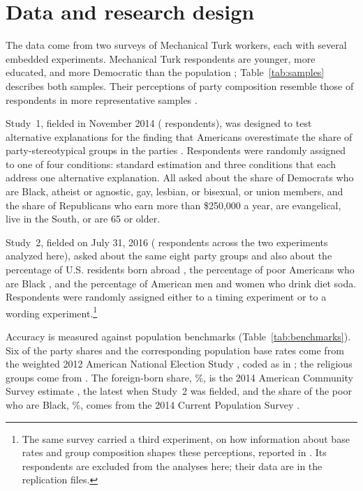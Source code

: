 \documentclass[11pt]{article}
\begin{document}
\section{Data and research design}

The data come from two surveys of Mechanical Turk workers, each with several embedded experiments. Mechanical Turk respondents are younger, more educated, and more Democratic than the population \citep{berinsky2012}; Table~\ref{tab:samples} describes both samples. Their perceptions of party composition resemble those of respondents in more representative samples \citep{ahler2018}.

Study~1, fielded in November 2014 (\nStudyOne{} respondents), was designed to test alternative explanations for the finding that Americans overestimate the share of party-stereotypical groups in the parties \citep{ahler2018}. Respondents were randomly assigned to one of four conditions: standard estimation and three conditions that each address one alternative explanation. All asked about the share of Democrats who are Black, atheist or agnostic, gay, lesbian, or bisexual, or union members, and the share of Republicans who earn more than \$250,000 a year, are evangelical, live in the South, or are 65 or older.

Study~2, fielded on July 31, 2016 (\nStudyTwo{} respondents across the two experiments analyzed here), asked about the same eight party groups and also about the percentage of U.S. residents born abroad \citep{alba2005}, the percentage of poor Americans who are Black \citep{gilens1996}, and the percentage of American men and women who drink diet soda. Respondents were randomly assigned either to a timing experiment or to a wording experiment.\footnote{The same survey carried a third experiment, on how information about base rates and group composition shapes these perceptions, reported in \citet{ahler2022typecast}. Its respondents are excluded from the analyses here; their data are in the replication files.}

Accuracy is measured against population benchmarks (Table~\ref{tab:benchmarks}). Six of the party shares and the corresponding population base rates come from the weighted 2012 American National Election Study \citep{anes2012}, coded as in \citet{ahler2018}; the religious groups come from \citet{pew2012nones}. The foreign-born share, \immTruth\%, is the 2014 American Community Survey estimate \citep{pew2016immigrants}, the latest when Study~2 was fielded, and the share of the poor who are Black, \poorTruth\%, comes from the 2014 Current Population Survey \citep{census2015}.
\end{document}
